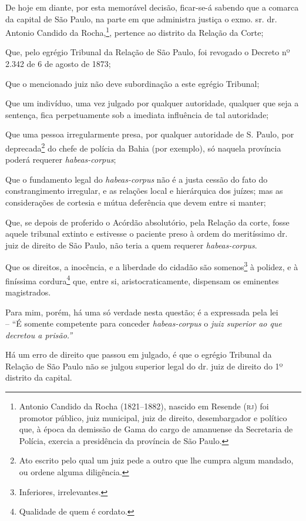 De hoje em diante, por esta memorável decisão, ficar-se-á sabendo que a
comarca da capital de São Paulo, na parte em que administra justiça o
exmo. sr. dr. Antonio Candido da Rocha,\footnote{ Antonio Candido da
  Rocha (1821--1882), nascido em Resende (\textsc{rj}) foi promotor público, juiz
  municipal, juiz de direito, desembargador e político que, à época da
  demissão de Gama do cargo de amanuense da Secretaria de Polícia,
  exercia a presidência da província de São Paulo.}, pertence ao
distrito da Relação da Corte;

Que, pelo egrégio Tribunal da Relação de São Paulo, foi revogado o
Decreto nº 2.342 de 6 de agosto de 1873;

Que o mencionado juiz não deve subordinação a este egrégio Tribunal;

Que um indivíduo, uma vez julgado por qualquer autoridade, qualquer que
seja a sentença, fica perpetuamente sob a imediata influência de tal
autoridade;

Que uma pessoa irregularmente presa, por qualquer autoridade de S.
Paulo, por deprecada\footnote{ Ato escrito pelo qual um juiz pede a
  outro que lhe cumpra algum mandado, ou ordene alguma diligência.} do
chefe de polícia da Bahia (por exemplo), só naquela província poderá
requerer \emph{habeas-corpus};

Que o fundamento legal do \emph{habeas-corpus} não é a justa cessão do
fato do constrangimento irregular, e as relações local e hierárquica dos
juízes; mas as considerações de cortesia e mútua deferência que devem
entre si manter;

Que, se depois de proferido o Acórdão absolutório, pela Relação da
corte, fosse aquele tribunal extinto e estivesse o paciente preso à
ordem do meritíssimo dr. juiz de direito de São Paulo, não teria a quem
requerer \emph{habeas-corpus}.

Que os direitos, a inocência, e a liberdade do cidadão são
somenos\footnote{ Inferiores, irrelevantes.} à polidez, e à finíssima
cordura\footnote{ Qualidade de quem é cordato.} que, entre si,
aristocraticamente, dispensam os eminentes magistrados.

Para mim, porém, há uma só verdade nesta questão; é a expressada pela
lei\\
-- ``É somente competente para conceder \emph{habeas-corpus} o \emph{juiz
superior ao que decretou a prisão.''}

Há um erro de direito que passou em julgado, é que o egrégio Tribunal da
Relação de São Paulo não se julgou superior legal do dr. juiz de direito
do 1º distrito da capital.

